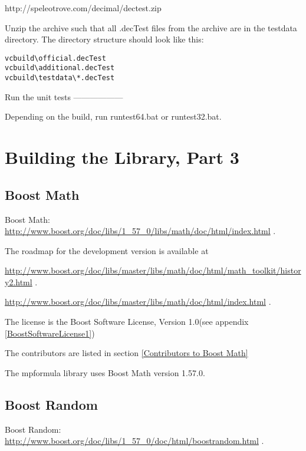 http://speleotrove.com/decimal/dectest.zip

Unzip the archive such that all .decTest files from the archive are in
the testdata directory. The directory structure should look like this:

\begin{verbatim}
vcbuild\official.decTest
vcbuild\additional.decTest
vcbuild\testdata\*.decTest
\end{verbatim}

Run the unit tests
------------------

Depending on the build, run runtest64.bat or runtest32.bat.






\newpage
\section{Building the Library, Part 3}


\subsection{Boost Math}
Boost Math: \href{http://www.boost.org/doc/libs/1_57_0/libs/math/doc/html/index.html}{http://www.boost.org/doc/libs/1\_57\_0/libs/math/doc/html/index.html} . 

The roadmap for the development version is available at

\href{http://www.boost.org/doc/libs/master/libs/math/doc/html/math_toolkit/history2.html}{http://www.boost.org/doc/libs/master/libs/math/doc/html/math\_toolkit/history2.html} . 

\href{http://www.boost.org/doc/libs/master/libs/math/doc/html/index.html}{http://www.boost.org/doc/libs/master/libs/math/doc/html/index.html} . 

The license is the Boost Software License, Version 1.0(see appendix \ref{BoostSoftwareLicense1})

The contributors are listed in section \ref{Contributors to Boost Math}

The mpformula library uses Boost Math version 1.57.0.



\subsection{Boost Random}
Boost Random: \href{http://www.boost.org/doc/libs/1_57_0/doc/html/boost_random.html}{http://www.boost.org/doc/libs/1\_57\_0/doc/html/boostrandom.html} . 

